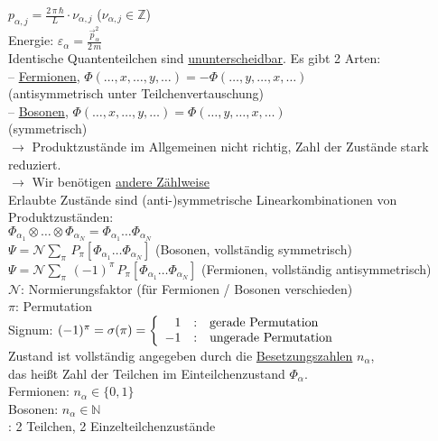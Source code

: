 \begin{tabbing}
\> $p_{\alpha,j} = \frac{2\,\pi \,\hbar}{L}\cdot \nu_{\alpha,j}$
($\nu_{\alpha,j} \in \mathbb{Z}$)\\
\>Energie: $\varepsilon_{\alpha} = \frac{\vec{p}_{\alpha}^2}{2\, m}$\\
Identische Quantenteilchen sind \underline{ununterscheidbar}. Es gibt 2 Arten:\\
-- \underline{ Fermionen}, \> \>$\Phi(\dots,x,\dots,y,\dots) = - \Phi(\dots,y,\dots,x,\dots)$\\
  \>\> (antisymmetrisch unter Teilchenvertauschung)\\
-- \underline{Bosonen}, \> \> $\Phi(\dots,x,\dots,y,\dots) = \Phi(\dots,y,\dots,x,\dots)$\\
  \>\> (symmetrisch)\\
$\rightarrow$ \> Produktzustände im Allgemeinen nicht richtig, Zahl der Zustände stark reduziert.\\
$\rightarrow$ \> Wir benötigen \underline{andere Zählweise}\\
Erlaubte Zustände sind (anti-)symmetrische Linearkombinationen von Produktzuständen:\\
\>$\Phi_{\alpha_1} \otimes \dots \otimes \Phi_{\alpha_N} = \Phi_{\alpha_1}\dots \Phi_{\alpha_N}$\\
\> $\Psi = \mathcal{N} \sum\limits_{\pi}\,P_{\pi}\left[\Phi_{\alpha_1}\dots \Phi_{\alpha_N}\right]$ \quad (Bosonen, vollständig symmetrisch)\\
\> $\Psi = \mathcal{N} \sum\limits_{\pi}\,(-1)^{\pi}\,P_{\pi}\left[\Phi_{\alpha_1}\dots \Phi_{\alpha_N}\right]$ \quad (Fermionen, vollständig antisymmetrisch)\\
\> $\mathcal{N}$: Normierungsfaktor (für Fermionen / Bosonen verschieden)\\
\> $\pi$: Permutation\\
\> Signum: $(-1)^{\pi} = \sigma(\pi) = \left\{ \begin{array}{r@{\quad : \quad} l }1 & \text{gerade Permutation}\\ -1 & \text{ungerade Permutation}\\\end{array}\right.$\\
Zustand ist vollständig angegeben durch die \underline{Besetzungszahlen} $n_{\alpha}$,\\
das heißt Zahl der Teilchen im Einteilchenzustand $\Phi_{\alpha}$.\\
\> Fermionen: $n_{\alpha} \in \{0,1\}$\\
\> Bosonen: $n_{\alpha} \in \mathbb{N}$\\
: 2 Teilchen, 2 Einzelteilchenzustände
\end{tabbing}

